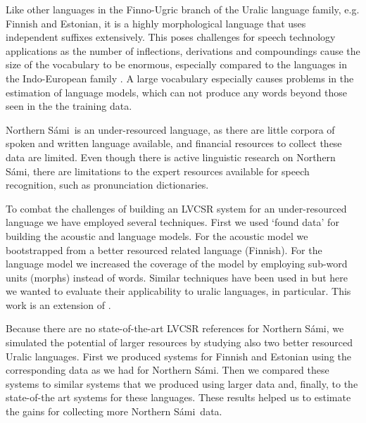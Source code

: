 \documentclass[b5paper]{article}
\newcommand{\ns}{Northern Sámi}
\begin{document}
Like other languages in the Finno-Ugric branch of the Uralic language family, e.g. Finnish and Estonian, it is a highly morphological language that uses independent suffixes extensively. This poses challenges for speech technology applications as the number of inflections, derivations and compoundings cause the size of the vocabulary to be enormous, especially compared to the languages in the Indo-European family \cite{karlsson1982}.  A large vocabulary especially causes problems in the estimation of language models, which can not produce any words beyond those seen in the the training data. 

\ns\ is an under-resourced language, as there are little corpora of spoken and written language available, and financial resources to collect these data are limited. Even though there is active linguistic research on \ns, there are limitations to the expert resources available for speech recognition, such as pronunciation dictionaries. 

To combat the challenges of building an LVCSR system for an under-resourced language we have employed several techniques. First we used `found data' for building the acoustic and language models. For the acoustic model we bootstrapped from a better resourced related language (Finnish). For the language model we increased the coverage of the model by employing sub-word units (morphs) instead of words. Similar techniques have been used in \cite{besacier2014automatic,viet2009} but here we wanted to evaluate their applicability to uralic languages, in particular. This work is an extension of \cite{leinonen2015}.


Because there are no state-of-the-art LVCSR references for \ns, we simulated the potential of larger resources by studying also two better resourced Uralic languages. First we produced systems for Finnish and Estonian using the corresponding data as we had for \ns. Then we compared these systems to similar systems that we produced using larger data and, finally, to the state-of-the art systems for these languages. These results helped us to estimate the gains for collecting more \ns\ data.
\end{document}
